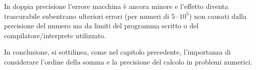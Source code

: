 
In doppia precisione l'errore macchina è ancora minore e l'effetto diventa trascurabile
subentrano ulteriori errori (per numeri di $5 \cdot 10^5$) non causati dalla precisione del numero ma da limiti 
del programma scritto o del compilatore/interprete utilizzato.

In conclusione, si sottilinea, come nel capitolo precedente, l'importanza di considerare
l'ordine della somma e la precisione del calcolo in problemi numerici.









